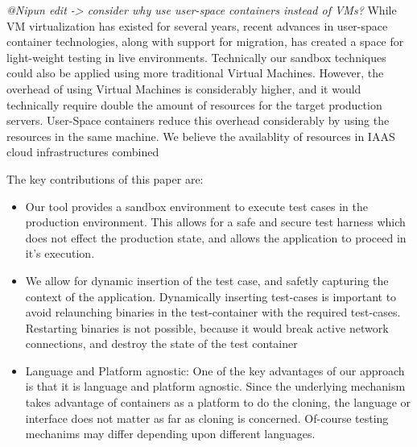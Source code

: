 \textit{@Nipun edit -> consider why use user-space containers instead of VMs?}
While VM virtualization has existed for several years, recent advances in user-space container technologies, along with support for migration, has created a space for light-weight testing in live environments.
Technically our sandbox techniques could also be applied using more traditional Virtual Machines. 
However, the overhead of using Virtual Machines is considerably higher, and it would technically require double the amount of resources for the target production servers.
User-Space containers reduce this overhead considerably by using the resources in the same machine.
We believe the availablity of resources in IAAS cloud infrastructures combined 


The key contributions of this paper are:

\begin{itemize}
\item Our tool provides a sandbox environment to execute test cases in the production environment. 
This allows for a safe and secure test harness which does not effect the production state, and allows the application to proceed in it's execution.
\item We allow for dynamic insertion of the test case, and safetly capturing the context of the application. Dynamically inserting test-cases is important to avoid relaunching binaries in the test-container with the required test-cases. 
Restarting binaries is not possible, because it would break active network connections, and destroy the state of the test container
\item Language and Platform agnostic: One of the key advantages of our approach is that it is language and platform agnostic. Since the underlying mechanism takes advantage of containers as a platform to do the cloning, the language or interface does not matter as far as cloning is concerned. 
Of-course testing mechanims may differ depending upon different languages.
\end{itemize}




